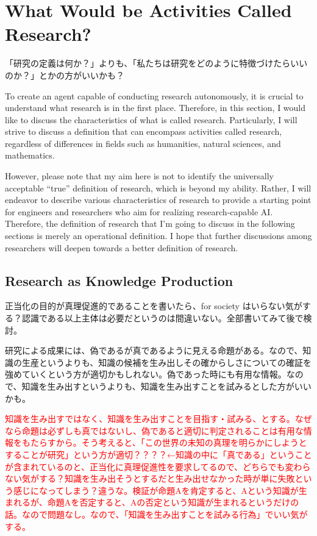 \section{What Would be Activities Called Research?}
\label{section-what-is-research}

「研究の定義は何か？」よりも、「私たちは研究をどのように特徴づけたらいいのか？」とかの方がいいかも？

To create an agent capable of conducting research autonomously, it is crucial to understand what research is in the first place. Therefore, in this section, I would like to discuss the characteristics of what is called research. Particularly, I will strive to discuss a definition that can encompass activities called research, regardless of differences in fields such as humanities, natural sciences, and mathematics.



However, please note that my aim here is not to identify the universally acceptable ``true'' definition of research, which is beyond my ability. Rather, I will endeavor to describe various characteristics of research to  provide a starting point for engineers and researchers who aim for realizing research-capable AI. Therefore, the definition of research that I'm going to discuss in the following sections is merely an operational definition. I hope that further discussions among researchers will deepen towards a better definition of research.

\subsection{Research as Knowledge Production}

正当化の目的が真理促進的であることを書いたら、for society はいらない気がする？認識である以上主体は必要だというのは間違いない。全部書いてみて後で検討。

研究による成果には、偽であるが真であるように見える命題がある。なので、知識の生産というよりも、知識の候補を生み出しその確からしさについての確証を強めていくという方が適切かもしれない。偽であった時にも有用な情報。なので、知識を生み出すというよりも、知識を生み出すことを試みるとした方がいいかも。

\textcolor{red}{
知識を生み出すではなく、知識を生み出すことを目指す・試みる、とする。なぜなら命題は必ずしも真ではないし、偽であると適切に判定されることは有用な情報をもたらすから。そう考えると、「この世界の未知の真理を明らかにしようとすることが研究」という方が適切？？？？←知識の中に「真である」ということが含まれているのと、正当化に真理促進性を要求してるので、どちらでも変わらない気がする？知識を生み出そうとするだと生み出せなかった時が単に失敗という感じになってしまう？違うな。検証が命題Aを肯定すると、Aという知識が生まれるが、命題Aを否定すると、Aの否定という知識が生まれるというだけの話。なので問題なし。なので、「知識を生み出すことを試みる行為」でいい気がする。
}

